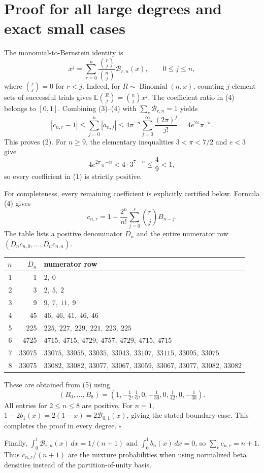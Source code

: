 \documentclass[11pt]{article}
\newcommand{\bb}{\mathcal B}
\begin{document}
\section*{Proof for all large degrees and exact small cases}
The monomial-to-Bernstein identity is
\[
 x^j=\sum_{r=0}^n\frac{\binom rj}{\binom nj}\bb_{r,n}(x),
 \qquad 0\leq j\leq n,
 \tag{4}
\]
where \(\binom rj=0\) for \(r<j\).
Indeed, for \(R\sim\operatorname{Binomial}(n,x)\), counting \(j\)-element
sets of successful trials gives
\(\mathbb E\binom Rj=\binom nj x^j\).
The coefficient ratio in (4) belongs to \([0,1]\).
Combining (3)--(4) with \(\sum_r\bb_{r,n}=1\) yields
\[
 |c_{n,r}-1|
 \leq\sum_{j=0}^n|a_{n,j}|
 \leq4\pi^{-n}\sum_{j=0}^\infty\frac{(2\pi)^j}{j!}
 =4e^{2\pi}\pi^{-n}.
\]
This proves (2). For \(n\geq9\), the elementary inequalities
\(3<\pi<7/2\) and \(e<3\) give
\[
 4e^{2\pi}\pi^{-n}<4\cdot3^{7-n}\leq\frac49<1,
\]
so every coefficient in (1) is strictly positive.

For completeness, every remaining coefficient is explicitly certified
below. Formula (4) gives
\[
 c_{n,r}
 =1-\frac{2^n}{n!}\sum_{j=0}^{r}\binom rj B_{n-j}.
 \tag{5}
\]
The table lists a positive denominator \(D_n\) and the entire numerator
row \((D_n c_{n,0},\ldots,D_n c_{n,n})\).
\begin{center}\small
\begin{tabular}{r|r|l}
\(n\)&\(D_n\)&numerator row\\ \hline
1&1&\(2,\ 0\)\\
2&3&\(2,\ 5,\ 2\)\\
3&9&\(9,\ 7,\ 11,\ 9\)\\
4&45&\(46,\ 46,\ 41,\ 46,\ 46\)\\
5&225&\(225,\ 227,\ 229,\ 221,\ 223,\ 225\)\\
6&4725&\(4715,\ 4715,\ 4729,\ 4757,\ 4729,\ 4715,\ 4715\)\\
7&33075&\(33075,\ 33055,\ 33035,\ 33043,\ 33107,\ 33115,\ 33095,\ 33075\)\\
8&33075&\(33082,\ 33082,\ 33077,\ 33067,\ 33059,\ 33067,\ 33077,\ 33082,\ 33082\)
\end{tabular}
\end{center}
These are obtained from (5) using
\[
 (B_0,\ldots,B_8)=
 \left(1,-\tfrac12,\tfrac16,0,-\tfrac1{30},0,
       \tfrac1{42},0,-\tfrac1{30}\right).
\]
All entries for \(2\leq n\leq8\) are positive. For \(n=1\),
\(1-2b_1(x)=2(1-x)=2\bb_{0,1}(x)\), giving the stated boundary
case. This completes the proof in every degree. \(\square\)

Finally, \(\int_0^1\bb_{r,n}(x)\,dx=1/(n+1)\) and
\(\int_0^1b_n(x)\,dx=0\), so
\(\sum_r c_{n,r}=n+1\).
Thus \(c_{n,r}/(n+1)\) are the mixture probabilities when using
normalized beta densities instead of the partition-of-unity basis.
\newpage
\end{document}
